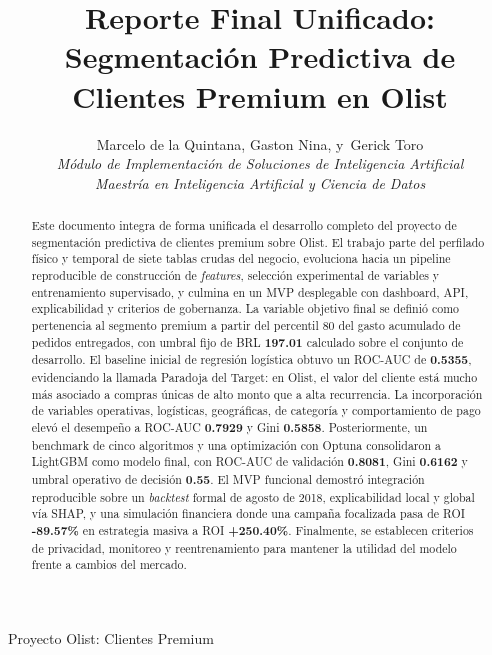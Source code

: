 \documentclass[journal,letterpaper]{IEEEtran}
\begin{document}
\title{Reporte Final Unificado: Segmentación Predictiva de Clientes Premium en Olist}

\author{Marcelo de la Quintana,
        Gaston Nina,
        y~Gerick Toro\\
        \textit{Módulo de Implementación de Soluciones de Inteligencia Artificial}\\
        \textit{Maestría en Inteligencia Artificial y Ciencia de Datos}}

%
{Proyecto Olist: Clientes Premium}

\maketitle

\begin{abstract}
Este documento integra de forma unificada el desarrollo completo del proyecto de segmentación predictiva de clientes premium sobre Olist. El trabajo parte del perfilado físico y temporal de siete tablas crudas del negocio, evoluciona hacia un pipeline reproducible de construcción de \textit{features}, selección experimental de variables y entrenamiento supervisado, y culmina en un MVP desplegable con dashboard, API, explicabilidad y criterios de gobernanza. La variable objetivo final se definió como pertenencia al segmento premium a partir del percentil 80 del gasto acumulado de pedidos entregados, con umbral fijo de BRL \textbf{197.01} calculado sobre el conjunto de desarrollo. El baseline inicial de regresión logística obtuvo un ROC-AUC de \textbf{0.5355}, evidenciando la llamada Paradoja del Target: en Olist, el valor del cliente está mucho más asociado a compras únicas de alto monto que a alta recurrencia. La incorporación de variables operativas, logísticas, geográficas, de categoría y comportamiento de pago elevó el desempeño a ROC-AUC \textbf{0.7929} y Gini \textbf{0.5858}. Posteriormente, un benchmark de cinco algoritmos y una optimización con Optuna consolidaron a LightGBM como modelo final, con ROC-AUC de validación \textbf{0.8081}, Gini \textbf{0.6162} y umbral operativo de decisión \textbf{0.55}. El MVP funcional demostró integración reproducible sobre un \textit{backtest} formal de agosto de 2018, explicabilidad local y global vía SHAP, y una simulación financiera donde una campaña focalizada pasa de ROI \textbf{-89.57\%} en estrategia masiva a ROI \textbf{+250.40\%}. Finalmente, se establecen criterios de privacidad, monitoreo y reentrenamiento para mantener la utilidad del modelo frente a cambios del mercado.
\end{abstract}
\end{document}

